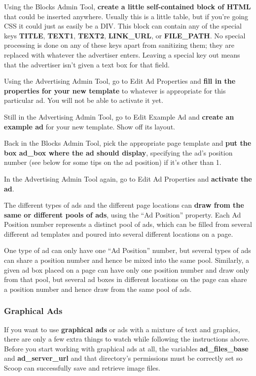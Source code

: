 Using the Blocks Admin Tool, {\bf create a little self-contained block of HTML} that could be inserted anywhere.  Usually this is a little table, but if you're going CSS it could just as easily be a DIV.  This block can contain any of the special keys {\bf TITLE}, {\bf TEXT1}, {\bf TEXT2}, {\bf LINK\_URL}, or {\bf FILE\_PATH}.  No special processing is done on any of these keys apart from sanitizing them; they are replaced with whatever the advertiser enters.  Leaving a special key out means that the advertiser isn't given a text box for that field.

Using the Advertising Admin Tool, go to Edit Ad Properties and {\bf fill in the properties for your new template} to whatever is appropriate for this particular ad.  You will not be able to activate it yet.

Still in the Advertising Admin Tool, go to Edit Example Ad and {\bf create an example ad} for your new template.  Show off its layout.

Back in the Blocks Admin Tool, pick the appropriate page template and {\bf put the box ad\_box where the ad should display}, specifying the ad's position number (see below for some tips on the ad position) if it's other than 1.

In the Advertising Admin Tool again, go to Edit Ad Properties and {\bf activate the ad}.

The different types of ads and the different page locations can {\bf draw from the same or different pools of ads}, using the ``Ad Position'' property.  Each Ad Position number represents a distinct pool of ads, which can be filled from several different ad templates and poured into several different locations on a page.

One type of ad can only have one ``Ad Position'' number, but several types of ads can share a position number and hence be mixed into the same pool.  Similarly, a given ad box placed on a page can have only one position number and draw only from that pool, but several ad boxes in different locations on the page can share a position number and hence draw from the same pool of ads.  

\subsubsection{Graphical Ads}

If you want to use {\bf graphical ads} or ads with a mixture of text and graphics, there are only a few extra things to watch while following the instructions above. Before you start working with graphical ads at all, the variables {\bf ad\_files\_base} and {\bf ad\_server\_url} and that directory's permissions must be correctly set so Scoop can successfully save and retrieve image files.

